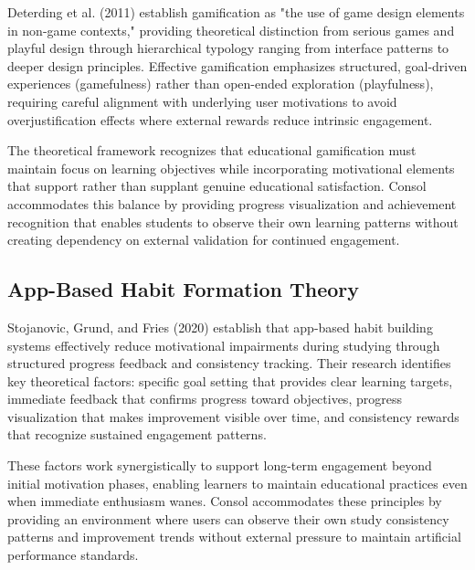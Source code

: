 Deterding et al. (2011) establish gamification as "the use of game design elements in non-game contexts," providing theoretical distinction from serious games and playful design through hierarchical typology ranging from interface patterns to deeper design principles. Effective gamification emphasizes structured, goal-driven experiences (gamefulness) rather than open-ended exploration (playfulness), requiring careful alignment with underlying user motivations to avoid overjustification effects where external rewards reduce intrinsic engagement.

The theoretical framework recognizes that educational gamification must maintain focus on learning objectives while incorporating motivational elements that support rather than supplant genuine educational satisfaction. Consol accommodates this balance by providing progress visualization and achievement recognition that enables students to observe their own learning patterns without creating dependency on external validation for continued engagement.



\subsection{App-Based Habit Formation Theory}

Stojanovic, Grund, and Fries (2020) establish that app-based habit building systems effectively reduce motivational impairments during studying through structured progress feedback and consistency tracking. Their research identifies key theoretical factors: specific goal setting that provides clear learning targets, immediate feedback that confirms progress toward objectives, progress visualization that makes improvement visible over time, and consistency rewards that recognize sustained engagement patterns.

These factors work synergistically to support long-term engagement beyond initial motivation phases, enabling learners to maintain educational practices even when immediate enthusiasm wanes. Consol accommodates these principles by providing an environment where users can observe their own study consistency patterns and improvement trends without external pressure to maintain artificial performance standards.




